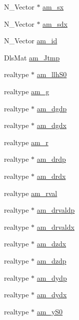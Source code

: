\begin{DoxyCompactItemize}
\item 
N\+\_\+\+Vector $\ast$ \hyperlink{struct_temp_data_a5253085927038bdeb7c327aa14470722}{am\+\_\+sx}
\item 
N\+\_\+\+Vector $\ast$ \hyperlink{struct_temp_data_a2457438c1ae3ea571031bc3c2e440da2}{am\+\_\+sdx}
\item 
N\+\_\+\+Vector \hyperlink{struct_temp_data_ad918917fdce710fbd6fe9774e35bfcfb}{am\+\_\+id}
\item 
Dls\+Mat \hyperlink{struct_temp_data_aa850cd4b6b24d0b98b4aac8f42a057a1}{am\+\_\+\+Jtmp}
\item 
realtype $\ast$ \hyperlink{struct_temp_data_ac8e571186f15f3172f69d2e016023fbc}{am\+\_\+llh\+S0}
\item 
realtype \hyperlink{struct_temp_data_abcec297db6f0e216e479c6f4f2cdb5ff}{am\+\_\+g}
\item 
realtype $\ast$ \hyperlink{struct_temp_data_a081b11391c89402abac604021f6ccf9d}{am\+\_\+dgdp}
\item 
realtype $\ast$ \hyperlink{struct_temp_data_ae858332947a50294436a0bbf2b7a8ea1}{am\+\_\+dgdx}
\item 
realtype \hyperlink{struct_temp_data_a7f00edd52d15fce2def96917a9ee47dc}{am\+\_\+r}
\item 
realtype $\ast$ \hyperlink{struct_temp_data_ab9c815d99f44f36f068133746323b5cc}{am\+\_\+drdp}
\item 
realtype $\ast$ \hyperlink{struct_temp_data_a92cb58d44aef5760bf9ad22690e48113}{am\+\_\+drdx}
\item 
realtype \hyperlink{struct_temp_data_abf2c3d254f311ab4385f18cff8acb89a}{am\+\_\+rval}
\item 
realtype $\ast$ \hyperlink{struct_temp_data_af51ded83b415e8a9d8e4f67736d11d34}{am\+\_\+drvaldp}
\item 
realtype $\ast$ \hyperlink{struct_temp_data_ae474fa93074514dd5b9d6ef00aa7345d}{am\+\_\+drvaldx}
\item 
realtype $\ast$ \hyperlink{struct_temp_data_a9309d8a421155cac9ad1c3fd1b5b0f56}{am\+\_\+dzdx}
\item 
realtype $\ast$ \hyperlink{struct_temp_data_a1df093f48bf98db04c63e845d7b1d58b}{am\+\_\+dzdp}
\item 
realtype $\ast$ \hyperlink{struct_temp_data_a76083cb4a9598daa381dbaa9c17aadc6}{am\+\_\+dydp}
\item 
realtype $\ast$ \hyperlink{struct_temp_data_a062c7ecfd4107b320dfd2fc0e4211a6b}{am\+\_\+dydx}
\item 
realtype $\ast$ \hyperlink{struct_temp_data_a7c1a4e54905d0fea6c4ec952cd7a96d8}{am\+\_\+y\+S0}

\end{DoxyCompactItemize}
